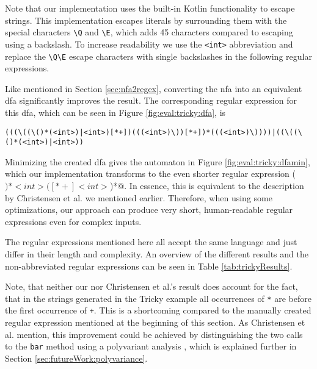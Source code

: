 Note that our implementation uses the built-in Kotlin functionality to escape strings. This implementation escapes literals by surrounding them with the special characters \lstinline|\Q| and \lstinline|\E|, which adds 45 characters compared to escaping using a backslash.
To increase readability we use the \lstinline|<int>| abbreviation and replace the \lstinline|\Q\E| escape characters with single backslashes in the following regular expressions.

Like mentioned in Section \ref{sec:nfa2regex}, converting the \ac{nfa} into an equivalent \ac{dfa} significantly improves the result. The corresponding regular expression for this \ac{dfa}, which can be seen in Figure \ref{fig:eval:tricky:dfa}, is 
\begin{Verbatim}[breaklines=true, breakanywhere=true]
(((\((\()*(<int>)|<int>)[*+])(((<int>)\))[*+])*(((<int>)\))))|((\((\()*(<int>)|<int>))
\end{Verbatim}

Minimizing the created \ac{dfa} gives the automaton in Figure \ref{fig:eval:tricky:dfamin}, which our implementation transforms to the even shorter regular expression \Verb@(\()*<int>([*+]<int>\))*@. In essence, this is equivalent to the description by Christensen et al. we mentioned earlier.
Therefore, when using some optimizations, our approach can produce very short, human-readable regular expressions even for complex inputs.

The regular expressions mentioned here all accept the same language and just differ in their length and complexity. An overview of the different results and the non-abbreviated regular expressions can be seen in Table \ref{tab:trickyResults}.

Note, that neither our nor Christensen et al.'s result does account for the fact, that in the strings generated in the Tricky example all occurrences of \lstinline|*| are before the first occurrence of \lstinline|+|. This is a shortcoming compared to the manually created regular expression mentioned at the beginning of this section.
As Christensen et al. mention, this improvement could be achieved by distinguishing the two calls to the \lstinline|bar| method using a polyvariant analysis \cite{brics}, which is explained further in Section \ref{sec:futureWork:polyvariance}.

